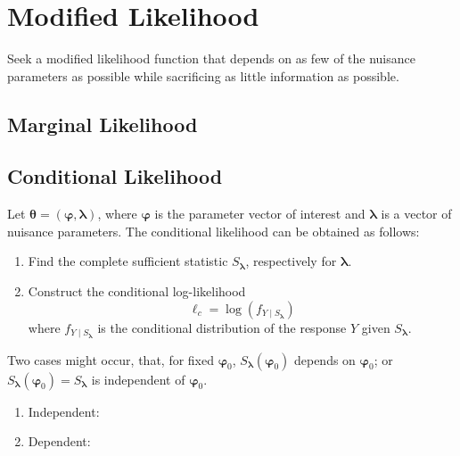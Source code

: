 \chapter{Modified Likelihood}

Seek a modified likelihood function that depends on as few of the nuisance parameters as possible while sacrificing as little information as possible.

\section{Marginal Likelihood}

\section{Conditional Likelihood}

Let $\boldsymbol{\theta}=(\boldsymbol{\varphi},\boldsymbol{\lambda})$, where $\boldsymbol{\varphi}$ is the parameter vector of interest and $\boldsymbol{\lambda}$ is a vector of nuisance parameters. The conditional likelihood can be obtained as follows:
\begin{enumerate}
    \item Find the complete sufficient statistic $S_{\boldsymbol{\lambda}}$, respectively for $\boldsymbol{\lambda}$.
    \item  Construct the conditional log-likelihood
          \begin{equation}
              \ell_{c}=\log\left(f_{Y\mid S_{\boldsymbol{\lambda}}}\right)
          \end{equation}
          where $f_{Y\mid S_{\boldsymbol{\lambda}}}$ is the conditional distribution of the response $Y$ given $S_{\boldsymbol{\lambda}}$.
\end{enumerate}

\begin{remark}
    Two cases might occur, that, for fixed $\boldsymbol{\varphi}_{0}$, $S_{\boldsymbol{\lambda}}\left(\boldsymbol{\varphi}_{0}\right)$ depends on $\boldsymbol{\varphi}_{0}$; or $S_{\boldsymbol{\lambda}}\left(\boldsymbol{\varphi}_{0}\right)=S_{\boldsymbol{\lambda}}$ is independent of $\boldsymbol{\varphi}_{0}$.
    \begin{enumerate}
        \item Independent:
        \item Dependent:
    \end{enumerate}
\end{remark}

